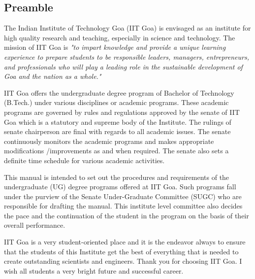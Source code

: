 \begin{center}
    \section*{Preamble }
\end{center}
The Indian Institute of Technology Goa (IIT Goa) is envisaged as an institute for high quality research and teaching, especially in science and technology. The mission of IIT Goa is \textit{"to impart knowledge and provide a unique learning experience to prepare students to be responsible leaders, managers, entrepreneurs, and professionals who will play a leading role in the sustainable development of Goa and the nation as a whole."}

IIT Goa offers the undergraduate degree program of Bachelor of Technology (B.Tech.) under various disciplines or academic programs. These academic programs are governed by rules and regulations approved by the senate of IIT Goa which is a statutory and supreme body of the Institute. The rulings of senate chairperson are final with regards to all academic issues. The senate continuously monitors the academic programs and makes appropriate modifications /improvements as and when required. The senate also sets a definite time schedule for various academic activities. 

This manual is intended to set out the procedures and requirements of the undergraduate (UG) degree programs offered at IIT Goa. Such programs fall under the purview of the Senate Under-Graduate Committee (SUGC) who are responsible for drafting the manual. This institute level committee also decides the pace and the continuation of the student in the program on the basis of their overall performance.

IIT Goa is a very student-oriented place and it is the endeavor always to ensure that the students of this Institute get the best of everything that is needed to create outstanding scientists and engineers. Thank you for choosing IIT Goa. I wish all students a very bright future and successful career.